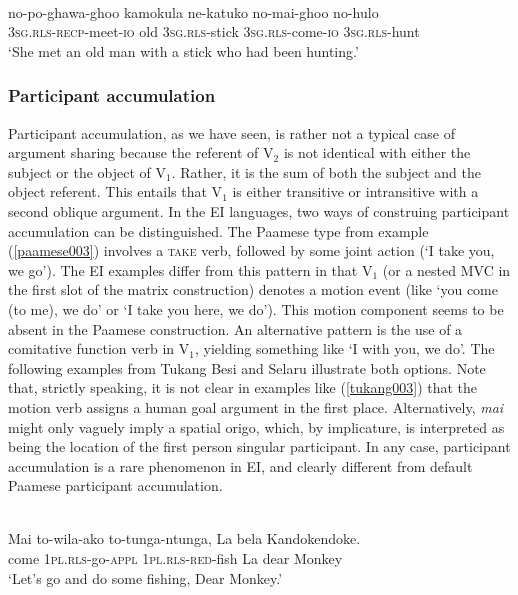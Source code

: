 \ea \label{muna0016}
\\
\gll no-po-ghawa-ghoo kamokula ne-katuko no-mai-ghoo no-hulo \\
3\textsc{sg}.\textsc{rls}-\textsc{recp}-meet-\textsc{io} old 3\textsc{sg}.\textsc{rls}-stick 3\textsc{sg}.\textsc{rls}-come-\textsc{io} 3\textsc{sg}.\textsc{rls}-hunt \\
\glft `She met an old man with a stick who had been hunting.'\\ 
\z

\subsubsection{Participant accumulation}

Participant accumulation, as we have seen, is rather not a typical case of argument sharing because the referent of V$_2$ is not identical with either the subject or the object of V$_1$. Rather, it is the sum of both the subject and the object referent. This entails that V$_1$ is either transitive or intransitive with a second oblique argument. In the EI languages, two ways of construing participant accumulation can be distinguished. The Paamese type from example (\ref{paamese003}) involves a \textsc{take} verb, followed by some joint action (`I take you, we go'). The EI examples differ from this pattern in that V$_1$ (or a nested MVC in the first slot of the matrix construction) denotes a motion event (like `you come (to me), we do' or `I take you here, we do'). This motion component seems to be absent in the Paamese construction. An alternative pattern is the use of a comitative function verb in V$_1$, yielding something like `I with you, we do'. The following examples from Tukang Besi and Selaru illustrate both options. Note that, strictly speaking, it is not clear in examples like (\ref{tukang003}) that the motion verb assigns a human goal argument in the first place. Alternatively, \textit{mai} might only vaguely imply a spatial origo, which, by implicature, is interpreted as being the location of the first person singular participant. In any case, participant accumulation is a rare phenomenon in EI, and clearly different from default Paamese participant accumulation.

\ea \label{tukang003}
\\
\gll Mai to-wila-ako to-tunga-ntunga, La bela Kandokendoke. \\
come 1\textsc{pl}.\textsc{rls}-go-\textsc{appl} 1\textsc{pl}.\textsc{rls}-\textsc{red}-fish La dear Monkey \\
\glft `Let's go and do some fishing, Dear Monkey.'\\ 
\z


